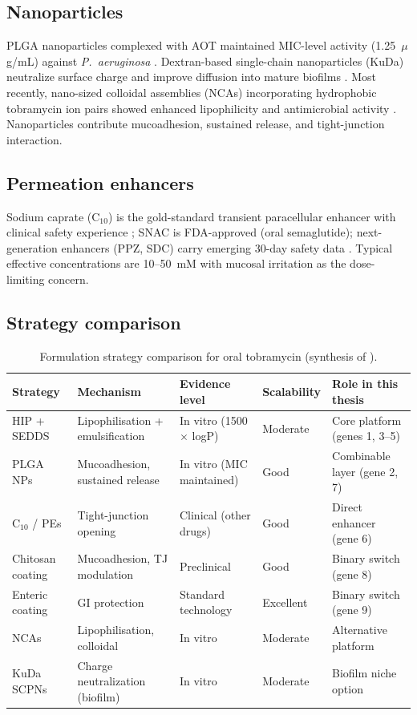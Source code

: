\subsection{Nanoparticles}
PLGA nanoparticles complexed with AOT maintained MIC-level activity (1.25~$\mu$g/mL) against \textit{P.~aeruginosa} \citep{Hill2019}. Dextran-based single-chain nanoparticles (KuDa) neutralize surface charge and improve diffusion into mature biofilms \citep{BlancoCabra2022}. Most recently, nano-sized colloidal assemblies (NCAs) incorporating hydrophobic tobramycin ion pairs showed enhanced lipophilicity and antimicrobial activity \citep{Khaled2026}. Nanoparticles contribute mucoadhesion, sustained release, and tight-junction interaction.

\subsection{Permeation enhancers}
Sodium caprate (C$_{10}$) is the gold-standard transient paracellular enhancer with clinical safety experience \citep{Maher2009}; SNAC is FDA-approved (oral semaglutide); next-generation enhancers (PPZ, SDC) carry emerging 30-day safety data \citep{Bohley2024}. Typical effective concentrations are 10--50~mM with mucosal irritation as the dose-limiting concern.

\subsection{Strategy comparison}
\begin{table}[htbp]
\centering
\caption{Formulation strategy comparison for oral tobramycin (synthesis of \citealt{Asad2023, Hill2019, BlancoCabra2022, Bohley2024, Khaled2026, Maher2009, Griesser2017}).}
\label{tab:strategy-comparison}
\small
\begin{tabular}{p{2.6cm}p{3.4cm}p{3.2cm}p{2.2cm}p{2.2cm}}
\toprule
Strategy & Mechanism & Evidence level & Scalability & Role in this thesis\\
\midrule
HIP + SEDDS & Lipophilisation + emulsification & In vitro (1500$\times$ logP) \citep{Asad2023} & Moderate & Core platform (genes 1, 3--5)\\
PLGA NPs & Mucoadhesion, sustained release & In vitro (MIC maintained) \citep{Hill2019} & Good & Combinable layer (gene 2, 7)\\
C$_{10}$ / PEs & Tight-junction opening & Clinical (other drugs) \citep{Maher2009, Bohley2024} & Good & Direct enhancer (gene 6)\\
Chitosan coating & Mucoadhesion, TJ modulation & Preclinical & Good & Binary switch (gene 8)\\
Enteric coating & GI protection & Standard technology & Excellent & Binary switch (gene 9)\\
NCAs & Lipophilisation, colloidal & In vitro \citep{Khaled2026} & Moderate & Alternative platform\\
KuDa SCPNs & Charge neutralization (biofilm) & In vitro \citep{BlancoCabra2022} & Moderate & Biofilm niche option\\
\bottomrule
\end{tabular}
\end{table}

